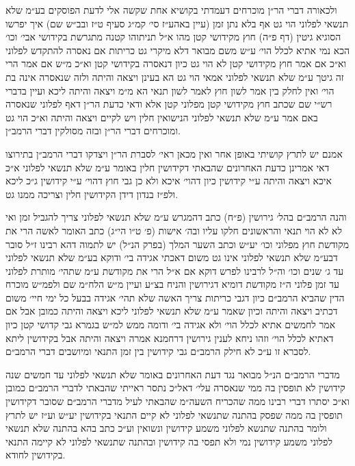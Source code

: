 \documentclass[12pt, openany]{book}
\begin{document}
\begin{multicols}{2}
ולכאורה דברי הר״ן מוכרחים דעמדתי בקושיא אחת שקשה אלי לדעת הפוסקים בע״מ שלא תנשאי לפלוני הוי גט אף בלא נתן זמן (עיין באהע״ז סי׳ קמ״ג סעיף ט״ז ובב״ש שם) איך יפרשו הסוגיא גיטין (דף פ״ה) חוץ מקידושי קטן מהו א״ל תניתוהו קטנה מתגרשת בקידושי אבי׳ וכו׳ הכא נמי אתיא לכלל הוי׳ ע״ש משם מבואר דלא מיקרי גט כריתות אם נאסרה להתקדש לפלוני וא״כ אם אמר חוץ מקידושי קטן לא הוי גט כיון דנאסרה בקידושי קטן וא״כ מ״ש אם אמר הרי זה גיטך ע״מ שלא תנשאי לפלוני אמאי הוי גט הא בעינן ויצאה והיתה ולזה שנאסרה אינה בת הוי׳ ואין לחלק בין אמר לשון חוץ לאמר לשון תנאי הא מ״מ ויצאה והיתה ליכא ועיין בדברי רש״י שם שכתב חוץ מקידושי קטן מפלוני קטן אלא ודאי כדעת הר״ן דאף לפלוני שנאסרה באם אמר ע״מ שלא תנשאי לפלוני הנישואין חלין ויש לקיים ויצאה והיתה וא״כ הוי גט ומוכרחים דברי הר״ן ובזה מסולקין דברי הרמב״ן.\\\vspace{0pt}

אמנם יש לתרץ קושיתי באופן אחר ואין מכאן ראי׳ לסברת הר״ן ויצדקו דברי הרמב״ן בתירוצו דאי אמרינן כדעת האחרונים שהבאתי דקידושין חלין באומר ע״מ שלא תנשאי לפלוני א״כ איכא ויצאה והיתה ע״י קידושין כיון דהוי׳ איכא ולא כן גבי חוץ דהוי׳ ע״י קידושין ג״כ ליכא ולפ״ז בנדון דידן הקידושין חלין וצריכה ממנו גט.\\\vspace{0pt}

והנה הרמב״ם בהל׳ גירושין (פ״ח) כתב דהמגרש ע״מ שלא תנשאי לפלוני צריך להגביל זמן ואי לא לא הוי תנאי והראשונים חלקו עליו ובה׳ אישות (פ׳ ט״ו הי״ג) כתב האומר לאשה הרי את מקודשת חוץ מפלוני וכו׳ יע״ש וכתב השער המלך (בפרק הנ״ל) יש לתמוה דהא רבינו ז״ל סובר דבע״מ שלא תנשאי לפלוני אינו גט משום דאכתי אגידה בי׳ ודוקא בע״מ שלא תנשאי לפלוני עד ג׳ שנים וכו׳ וה״ל לרבינו לפרש דוקא אם א״ל הרי את מקודשת ע״מ שתהי׳ מותרת לפלוני עד זמן פלוני ה״ז מקודשת דומיא דגירושין והניח בצ״ע ועיין מ״ש הלח״מ שם ולפמ״ש מוכרח הדין שהביא הרמב״ם כיון דגבי כריתות צריך האשה שלא תהי׳ אגידה בבעל כל ימי חיי׳ משום דכתיב ויצאה והיתה וכיון שאמר ע״מ שלא תנשאי לפלוני ליכא ויצאה והיתה כמובן אבל אם אמר לחמשים אתיא לכלל הוי׳ ולא אגידה בי׳ ודומה ממש למ״ש בגמרא גבי קדושי קטן כיון דאתיא לכלל הוי׳ וזהו ניחא לענין גירושין דרחמנא אמרה ויצאה והיתה אבל בקידושין ליתא לסברא זו ע״כ לא חילק הרמב״ם גבי קידושין בין זמן התנאי ומיושבים דברי הרמב״ם.\\\vspace{0pt}

מדברי הרמב״ם הנ״ל מבואר נגד דעת האחרונים באומר שלא תנשאי לפלוני עד חמשים שנה קידושין לא תופסין בה ממי שנאסרה עלי׳ דאל״כ נתסר ראייתי שהבאתי לדברי הרמב״ם כמובן וא״כ יסתרו דברי רבינו ממה שהכריח השעה״מ שהבאתי לעיל מדברי הרמב״ם שסובר דקידושין תופסין בה ממה שפסק בהתנה שתנשאי לפלוני לא קיים התנאי בקידושין יע״ש וע״ז יש לתרץ ולומר בהתנה שתנשא לפלוני משמע קידושין ונשואין וע״כ כתב בהא בהתנה שלא תנשאי לפלוני משמע קידושין נמי ולא תפסי בה קידושין ובהתנה שתנשאי לפלוני לא קיימה התנאי בקידושין לחודא.\\\vspace{0pt}


\end{multicols}
\end{document}
